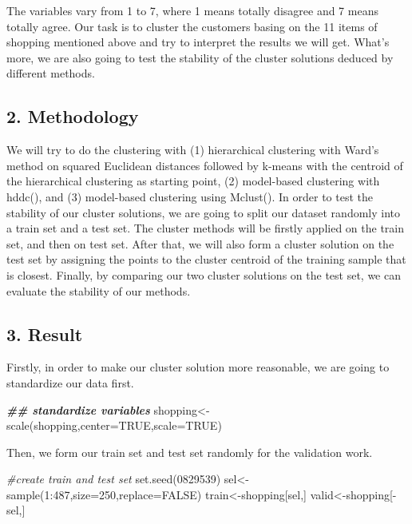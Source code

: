 \documentclass[
  11pt,
]{article}
\newenvironment{Shaded}{\begin{snugshade}}{\end{snugshade}}
\newcommand{\AttributeTok}[1]{\textcolor[rgb]{0.77,0.63,0.00}{#1}}
\newcommand{\CommentTok}[1]{\textcolor[rgb]{0.56,0.35,0.01}{\textit{#1}}}
\newcommand{\ConstantTok}[1]{\textcolor[rgb]{0.00,0.00,0.00}{#1}}
\newcommand{\DecValTok}[1]{\textcolor[rgb]{0.00,0.00,0.81}{#1}}
\newcommand{\DocumentationTok}[1]{\textcolor[rgb]{0.56,0.35,0.01}{\textbf{\textit{#1}}}}
\newcommand{\FunctionTok}[1]{\textcolor[rgb]{0.00,0.00,0.00}{#1}}
\newcommand{\NormalTok}[1]{#1}
\newcommand{\OtherTok}[1]{\textcolor[rgb]{0.56,0.35,0.01}{#1}}
\newcommand{\SpecialCharTok}[1]{\textcolor[rgb]{0.00,0.00,0.00}{#1}}
\begin{document}
The variables vary from 1 to 7, where 1 means totally disagree and 7 means totally agree.
Our task is to cluster the customers basing on the 11 items of shopping mentioned above and try to interpret the results we will get. What's more, we are also going to test the stability of the cluster solutions deduced by different methods.

\hypertarget{methodology-2}{%
\subsection{2. Methodology}\label{methodology-2}}

We will try to do the clustering with (1) hierarchical clustering with Ward's method on squared Euclidean distances followed by k-means with the centroid of the hierarchical clustering as starting point, (2) model-based clustering with hddc(), and (3) model-based clustering using Mclust(). In order to test the stability of our cluster solutions, we are going to split our dataset randomly into a train set and a test set. The cluster methods will be firstly applied on the train set, and then on test set. After that, we will also form a cluster solution on the test set by assigning the points to the cluster centroid of the training sample that is closest. Finally, by comparing our two cluster solutions on the test set, we can evaluate the stability of our methods.

\hypertarget{result}{%
\subsection{3. Result}\label{result}}

Firstly, in order to make our cluster solution more reasonable, we are going to standardize our data first.

\begin{Shaded}
\begin{Highlighting}[]
\DocumentationTok{\#\# standardize variables}
\NormalTok{shopping}\OtherTok{\textless{}{-}}\FunctionTok{scale}\NormalTok{(shopping,}\AttributeTok{center=}\ConstantTok{TRUE}\NormalTok{,}\AttributeTok{scale=}\ConstantTok{TRUE}\NormalTok{)}
\end{Highlighting}
\end{Shaded}

Then, we form our train set and test set randomly for the validation work.

\begin{Shaded}
\begin{Highlighting}[]
\CommentTok{\#create train and test set}
\FunctionTok{set.seed}\NormalTok{(}\DecValTok{0829539}\NormalTok{)}
\NormalTok{sel}\OtherTok{\textless{}{-}}\FunctionTok{sample}\NormalTok{(}\DecValTok{1}\SpecialCharTok{:}\DecValTok{487}\NormalTok{,}\AttributeTok{size=}\DecValTok{250}\NormalTok{,}\AttributeTok{replace=}\ConstantTok{FALSE}\NormalTok{)}
\NormalTok{train}\OtherTok{\textless{}{-}}\NormalTok{shopping[sel,]}
\NormalTok{valid}\OtherTok{\textless{}{-}}\NormalTok{shopping[}\SpecialCharTok{{-}}\NormalTok{sel,]}
\end{Highlighting}
\end{Shaded}
\end{document}
